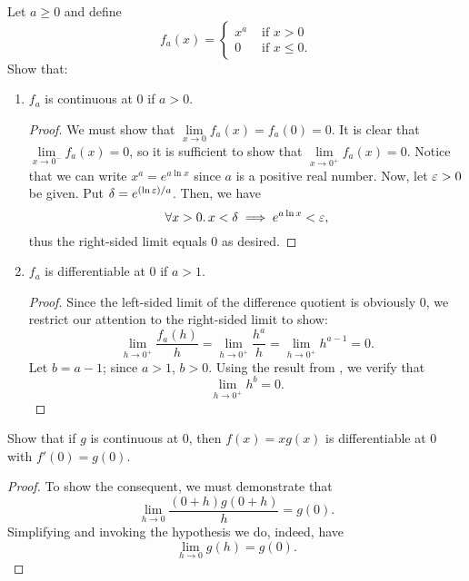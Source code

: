 \begin{problem}
  Let $a \geq 0$ and define
  \[
    f_{a}(x) =
    \begin{cases}
      x^{a} &\text{ if } x > 0\\
      0     &\text{ if } x \leq 0.
    \end{cases}
  \]
  Show that:
  \begin{enumerate}[label=(\roman*)]
    \item $f_{a}$ is continuous at $0$ if $a > 0$. \label{prob:real-positive-powers-rhs-limit}
      \begin{proof}
        We must show that $\lim\limits_{x \to 0} f_{a}(x) = f_{a}(0) = 0$. It is clear that
        $\lim\limits_{x \to 0^{-}} f_{a}(x) = 0$, so it is sufficient to show
        that $\lim\limits_{x \to 0^{+}} f_{a}(x) = 0$. Notice that we can write
        $x^{a} = e^{a \ln{x}}$ since $a$ is a positive real number. Now, let
        $\varepsilon > 0$ be given. Put $\delta = e^{(\ln{\varepsilon})/a}$.
        Then, we have
        \[
          \forall x > 0.\, x < \delta \implies e^{a \ln{x}} < \varepsilon,
        \]
        thus the right-sided limit equals $0$ as desired.
      \end{proof}

    \item $f_{a}$ is differentiable at $0$ if $a > 1$.
      \begin{proof}
        Since the left-sided limit of the difference quotient is obviously $0$,
        we restrict our attention to the right-sided limit to show:
        \[
          \lim_{h \to 0^{+}} \frac{f_{a}(h)}{h} = \lim_{h \to 0^{+}} \frac{h^{a}}{h} = \lim_{h \to 0^{+}} h^{a - 1} = 0.
        \]
        Let $b = a - 1$; since $a > 1$, $b > 0$. Using the result from
        , we verify that
        \[
          \lim_{h \to 0^{+}} h^{b} = 0.
        \]
      \end{proof}
  \end{enumerate}
\end{problem}


\begin{problem}
  Show that if $g$ is continuous at $0$, then $f(x) = xg(x)$ is differentiable at $0$ with $f'(0) = g(0)$.

  \begin{proof}
    To show the consequent, we must demonstrate that
    \[
      \lim_{h \to 0} \frac{(0 + h)g(0 + h)}{h} = g(0).
    \]
    Simplifying and invoking the hypothesis we do, indeed, have
    \[
      \lim_{h \to 0} g(h) = g(0).
    \]
  \end{proof}
\end{problem}
